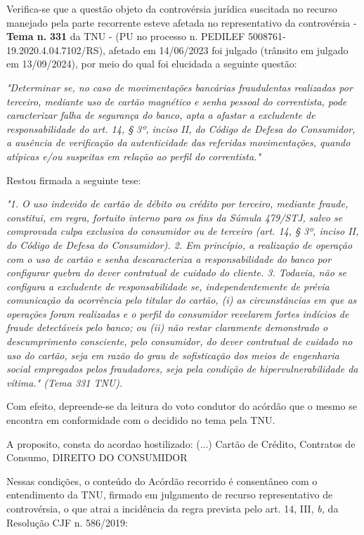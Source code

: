 \documentclass[12pt]{article}
\begin{document}
\justifying
\noindent Verifica-se que a questão objeto da controvérsia jurídica suscitada no recurso manejado pela parte recorrente esteve afetada no representativo da controvérsia - \textbf{Tema n. }\textbf{331} da TNU - (PU no processo n. PEDILEF 5008761-19.2020.4.04.7102/RS),  afetado em 14/06/2023 foi julgado (trânsito em julgado em 13/09/2024), por meio do qual foi elucidada a seguinte questão:

\noindent \textit{"Determinar se, no caso de movimentações bancárias fraudulentas realizadas por terceiro, mediante uso de cartão magnético e senha pessoal do correntista, pode caracterizar falha de segurança do banco, apta a afastar a excludente de responsabilidade do art. 14, § 3º, inciso II, do Código de Defesa do Consumidor, a ausência de verificação da autenticidade das referidas movimentações, quando atípicas e/ou suspeitas em relação ao perfil do correntista."}

\noindent Restou firmada a seguinte tese:

\noindent \textit{"1. O uso indevido de cartão de débito ou crédito por terceiro, mediante fraude, constitui, em regra, fortuito interno para os fins da Súmula 479/STJ, salvo se comprovada culpa exclusiva do consumidor ou de terceiro (art. 14, § 3º, inciso II, do Código de Defesa do Consumidor). 2. Em princípio, a realização de operação com o uso de cartão e senha descaracteriza a responsabilidade do banco por configurar quebra do dever contratual de cuidado do cliente. 3. Todavia, não se configura a excludente de responsabilidade se, independentemente de prévia comunicação da ocorrência pelo titular do cartão, (i) as circunstâncias em que as operações foram realizadas e o perfil do consumidor revelarem fortes indícios de fraude detectáveis pelo banco; ou (ii) não restar claramente demonstrado o descumprimento consciente, pelo consumidor, do dever contratual de cuidado no uso do cartão, seja em razão do grau de sofisticação dos meios de engenharia social empregados pelos fraudadores, seja pela condição de hipervulnerabilidade da vítima." (Tema 331 TNU).}

\noindent Com efeito, depreende-se da leitura do voto condutor do acórdão que o mesmo se encontra em conformidade com o decidido no  tema pela TNU.

\noindent A proposito, consta do acordao hostilizado: (...) Cartão de Crédito, Contratos de Consumo, DIREITO DO CONSUMIDOR

\noindent Nessas condições, o conteúdo do Acórdão recorrido é consentâneo com o entendimento da TNU, firmado em julgamento de recurso representativo de controvérsia, o que atrai a incidência da regra prevista pelo art. 14, III, \textit{b,} da Resolução CJF n. 586/2019:
\end{document}
